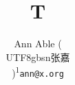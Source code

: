 \documentclass{article}
\usepackage{CJKutf8}
\usepackage{authblk}

\title{T}
\author[1]{\begin{minipage}{0.8\textwidth}\centering Ann Able (\begin{CJK*}{UTF8}{gbsn}张嘉\end{CJK*}){\textsuperscript{1}}\endgraf \texttt{ann@x.org}\end{minipage}}
\maketitle
Text.

